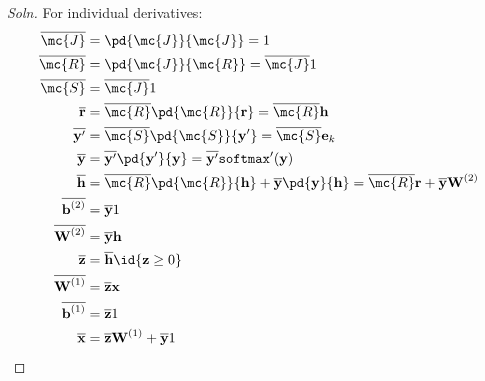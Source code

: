 \documentclass{article}
\begin{document}
	\subsubsection{}
	\begin{proof}[Soln]
		For individual derivatives:
		\begin{align}
			\overline{\mc{J}} &= \pd{\mc{J}}{\mc{J}} = 1 \\
			\overline{\mc{R}} &= \pd{\mc{J}}{\mc{R}} = \overline{\mc{J}}1 \\
			\overline{\mc{S}} &= \overline{\mc{J}} 1 \\
			\overline{\textbf{r}} &= \overline{\mc{R}} \pd{\mc{R}}{\textbf{r}} = \overline{\mc{R}} \textbf{h} \\
			\overline{\textbf{y}'} &= \overline{\mc{S}} \pd{\mc{S}}{\textbf{y}'} = \overline{\mc{S}} \textbf{e}_k \\
			\overline{\textbf{y}} &= \overline{\textbf{y}'} \pd{\textbf{y}'}{\textbf{y}} = \overline{\textbf{y}'}\texttt{softmax}'(\textbf{y}) \\
			\overline{\textbf{h}} &= \overline{\mc{R}} \pd{\mc{R}}{\textbf{h}} + \overline{\textbf{y}} \pd{\textbf{y}}{\textbf{h}} = \overline{\mc{R}} \textbf{r} + \overline{\textbf{y}} \textbf{W}^{(2)} \\
			\overline{\textbf{b}^{(2)}} &= \overline{\textbf{y}} 1 \\
			\overline{\textbf{W}^{(2)}} &= \overline{\textbf{y}} \textbf{h} \\
			\overline{\textbf{z}} &= \overline{\textbf{h}} \id{\textbf{z} \geq 0} \\
			\overline{\textbf{W}^{(1)}} &= \overline{\textbf{z}} \textbf{x} \\
			\overline{\textbf{b}^{(1)}} &= \overline{\textbf{z}} 1 \\
			\overline{\textbf{x}} &= \overline{\textbf{z}} \textbf{W}^{(1)} + \overline{\textbf{y}} 1
		\end{align}

\end{proof}
\end{document}
